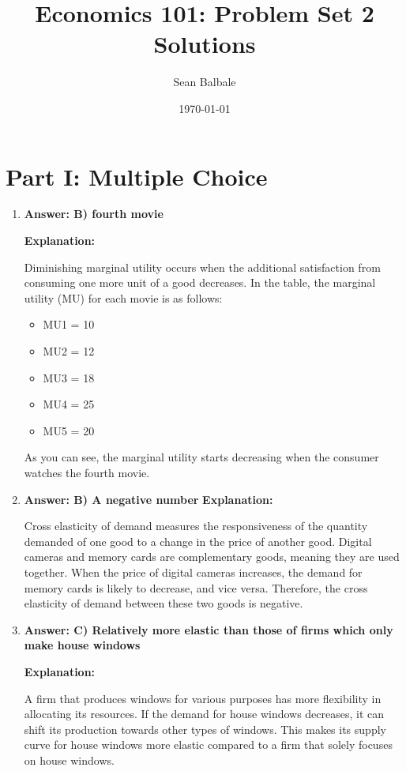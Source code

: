 \documentclass{article}
\title{Economics 101: Problem Set 2 Solutions}
\author{Sean Balbale}
\date{\today}
\begin{document}
\maketitle

\section*{Part I: Multiple Choice}

\begin{enumerate}
    \item \textbf{Answer: B) fourth movie}

          \textbf{Explanation:}

          Diminishing marginal utility occurs when the additional satisfaction from consuming one more unit of a good decreases. In the table, the marginal utility (MU) for each movie is as follows:

          \begin{itemize}
              \item MU1 = 10
              \item MU2 = 12
              \item MU3 = 18
              \item MU4 = 25
              \item MU5 = 20
          \end{itemize}

          As you can see, the marginal utility starts decreasing when the consumer watches the fourth movie.

    \item \textbf{Answer: B) A negative number}
          \textbf{Explanation:}

          Cross elasticity of demand measures the responsiveness of the quantity demanded of one good to a change in the price of another good. Digital cameras and memory cards are complementary goods, meaning they are used together. When the price of digital cameras increases, the demand for memory cards is likely to decrease, and vice versa. Therefore, the cross elasticity of demand between these two goods is negative.

    \item \textbf{Answer: C) Relatively more elastic than those of firms which only make house windows}

          \textbf{Explanation:}

          A firm that produces windows for various purposes has more flexibility in allocating its resources. If the demand for house windows decreases, it can shift its production towards other types of windows. This makes its supply curve for house windows more elastic compared to a firm that solely focuses on house windows.


\end{enumerate}
\end{document}
